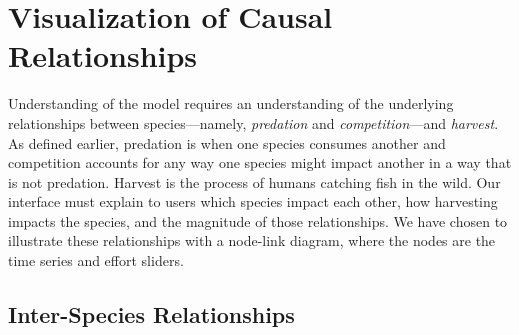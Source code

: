 \section{Visualization of Causal Relationships}

Understanding of the model requires an understanding of the underlying relationships between species---namely, \textit{predation} and \textit{competition}---and \textit{harvest}.  As defined earlier, predation is when one species consumes another and competition accounts for any way one species might impact another in a way that is not predation.  Harvest is the process of humans catching fish in the wild.  Our interface must explain to users which species impact each other, how harvesting impacts the species, and the magnitude of those relationships.  We have chosen to illustrate these relationships with a node-link diagram, where the nodes are the time series and effort sliders.

\subsection{Inter-Species Relationships}
\label{sec:interSpeciesArc}


